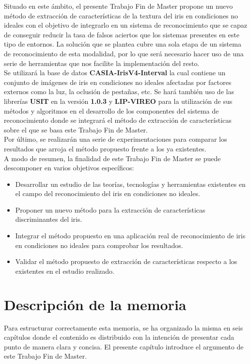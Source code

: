 Situado en este ámbito, el presente Trabajo Fin de Master propone un nuevo método de extracción de características de la textura del iris en condiciones no ideales con el objetivo de integrarlo en un sistema de reconocimiento que se capaz de conseguir reducir la tasa de falsos aciertos que los sistemas presentes en este tipo de entornos. La solución que se plantea cubre una sola etapa de un sistema de reconocimiento de esta modalidad, por lo que será necesario hacer uso de una serie de herramientas que nos facilite la implementación del resto. \\

Se utilizará la base de datos \textbf{CASIA-IrisV4-Interval} la cual contiene un conjunto de imágenes de iris en condiciones no ideales afectadas por factores externos como la luz, la oclusión de pestañas, etc. Se hará también uso de las librerías \textbf{USIT} en la versión \textbf{1.0.3} y \textbf{LIP-VIREO} para la utilización de sus métodos y algoritmos en el desarrollo de los componentes del sistema de reconocimiento donde se integrará el método de extracción de características sobre el que se basa este Trabajo Fin de Master. \\

Por último, se realizarán una serie de experimentaciones para comparar los resultados que arroja el método propuesto frente a los ya existentes. \\

A modo de resumen, la finalidad de este Trabajo Fin de Master se puede descomponer en varios objetivos específicos:
\begin{itemize}
	\item Desarrollar un estudio de las teorías, tecnologías y herramientas existentes en el campo del reconocimiento del iris en condiciones no ideales.
	\item Proponer un nuevo método para la extracción de características discriminantes del iris.
	\item Integrar el método propuesto en una aplicación real de reconocimiento de iris en condiciones no ideales para comprobar los resultados.
	\item Validar el método propuesto de extracción de características respecto a los existentes en el estudio realizado.
\end{itemize}


\section{Descripción de la memoria}
Para estructurar correctamente esta memoria, se ha organizado la misma en seis capítulos donde el contenido es distribuido con la intención de presentar cada punto de manera clara y concisa. El presente capítulo introduce el argumento de este Trabajo Fin de Master. \\

